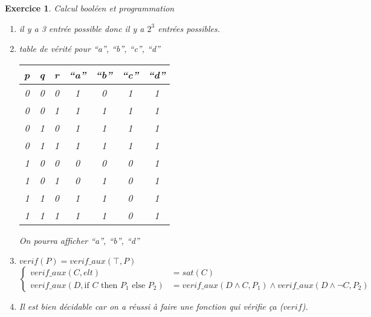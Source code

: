 \documentclass{article}
\theoremstyle{plain}
\newtheorem{exo}{Exercice}%
\begin{document}
\begin{exo} Calcul booléen et programmation
\begin{enumerate}
    \item il y a 3 entrée possible donc il y a $2^3$ entrées possibles.
    \item table de vérité pour ``a'', ``b'', ``c'', ``d'' \\
    \begin{tabular} {c|c|c|c|c|c|c}
        p & q & r & ``a'' & ``b''& ``c''& ``d''\\
        \hline
        0 & 0 & 0 & 1 & 0 & 1 & 1 \\
        0 & 0 & 1 & 1 & 1 & 1 & 1 \\
        0 & 1 & 0 & 1 & 1 & 1 & 1 \\
        0 & 1 & 1 & 1 & 1 & 1 & 1 \\
        1 & 0 & 0 & 0 & 0 & 0 & 1 \\
        1 & 0 & 1 & 0 & 1 & 0 & 1 \\
        1 & 1 & 0 & 1 & 1 & 0 & 1 \\
        1 & 1 & 1 & 1 & 1 & 0 & 1 
    \end{tabular}

    On pourra afficher ``a'', ``b'', ``d''
    \item $verif(P) = verif\_aux(\top, P)$
    \[
    \begin{cases}
        verif\_aux(C, elt) &= sat(C) \\
        verif\_aux(D, \text{if } C \text{ then } P_1 \text{ else } P_2) &= verif\_aux(D \wedge C, P_1) 
                                \wedge verif\_aux(D \wedge \neg C, P_2) 
    \end{cases}
    \]

    \item Il est bien décidable car on a réussi à faire une fonction qui vérifie ça ($verif$).
\end{enumerate}    
\end{exo}
\end{document}
